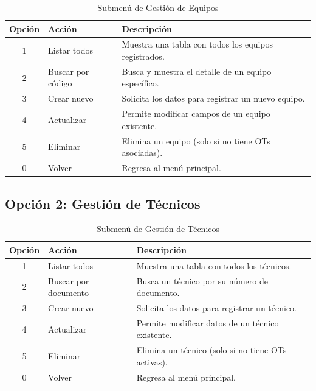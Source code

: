 \documentclass[12pt, a4paper]{article}
\begin{document}
\begin{table}[H]
    \centering
    \begin{tabularx}{\textwidth}{c l X}
        \toprule
        \textbf{Opci\'on} & \textbf{Acci\'on} & \textbf{Descripci\'on} \\
        \midrule
        1 & Listar todos & Muestra una tabla con todos los equipos registrados. \\
        2 & Buscar por c\'odigo & Busca y muestra el detalle de un equipo espec\'ifico. \\
        3 & Crear nuevo & Solicita los datos para registrar un nuevo equipo. \\
        4 & Actualizar & Permite modificar campos de un equipo existente. \\
        5 & Eliminar & Elimina un equipo (solo si no tiene OTs asociadas). \\
        0 & Volver & Regresa al men\'u principal. \\
        \bottomrule
    \end{tabularx}
    \caption{Submen\'u de Gesti\'on de Equipos}
\end{table}

\subsection{Opci\'on 2: Gesti\'on de T\'ecnicos}

\begin{table}[H]
    \centering
    \begin{tabularx}{\textwidth}{c l X}
        \toprule
        \textbf{Opci\'on} & \textbf{Acci\'on} & \textbf{Descripci\'on} \\
        \midrule
        1 & Listar todos & Muestra una tabla con todos los t\'ecnicos. \\
        2 & Buscar por documento & Busca un t\'ecnico por su n\'umero de documento. \\
        3 & Crear nuevo & Solicita los datos para registrar un t\'ecnico. \\
        4 & Actualizar & Permite modificar datos de un t\'ecnico existente. \\
        5 & Eliminar & Elimina un t\'ecnico (solo si no tiene OTs activas). \\
        0 & Volver & Regresa al men\'u principal. \\
        \bottomrule
    \end{tabularx}
    \caption{Submen\'u de Gesti\'on de T\'ecnicos}
\end{table}
\end{document}

